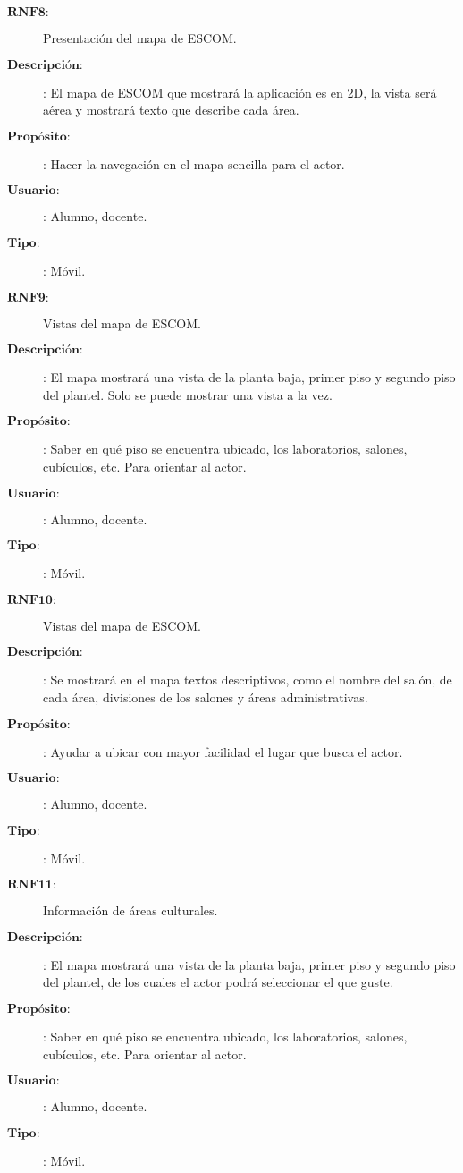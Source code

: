 \begin{description}
\item[$\textbf{RNF8:}$] Presentación del mapa de ESCOM.
\item[$\textbf{Descripción:}$]:  El mapa de ESCOM que mostrará la aplicación es en 2D, la vista será aérea y mostrará texto que describe cada área.
\item[$\textbf{Propósito:}$]: Hacer la navegación en el mapa sencilla para el actor.
\item[$\textbf{Usuario:}$]: Alumno, docente.
\item[$\textbf{Tipo:}$]: Móvil. \\
 
\item[$\textbf{RNF9:}$] Vistas del mapa de ESCOM.
\item[$\textbf{Descripción:}$]:  El mapa mostrará una vista de la planta baja, primer piso y segundo piso del plantel. Solo se puede mostrar una vista a la vez.
\item[$\textbf{Propósito:}$]: Saber en qué piso se encuentra ubicado, los laboratorios, salones, cubículos, etc. Para orientar al actor.
\item[$\textbf{Usuario:}$]: Alumno, docente.
\item[$\textbf{Tipo:}$]: Móvil. \\

\item[$\textbf{RNF10:}$] Vistas del mapa de ESCOM.
\item[$\textbf{Descripción:}$]:  Se mostrará en el mapa textos descriptivos, como el nombre del salón, de cada área, divisiones de los salones y áreas administrativas.
\item[$\textbf{Propósito:}$]: Ayudar a ubicar con mayor facilidad el lugar que busca el actor.
\item[$\textbf{Usuario:}$]: Alumno, docente.
\item[$\textbf{Tipo:}$]: Móvil. \\

\item[$\textbf{RNF11:}$] Información de áreas culturales.
\item[$\textbf{Descripción:}$]:  El mapa mostrará una vista de la planta baja, primer piso y segundo piso del plantel, de los cuales el actor podrá seleccionar el que guste.
\item[$\textbf{Propósito:}$]: Saber en qué piso se encuentra ubicado, los laboratorios, salones, cubículos, etc. Para orientar al actor.
\item[$\textbf{Usuario:}$]: Alumno, docente.
\item[$\textbf{Tipo:}$]: Móvil. \\



\end{description}

